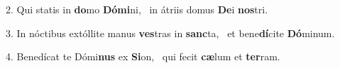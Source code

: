 2. Qui statis in \textbf{do}mo \textbf{Dó}\textbf{mi}ni, \ast\  in átriis domus \textbf{De}i \textbf{nos}tri.\

3. In nóctibus extóllite manus \textbf{ves}tras in \textbf{sanc}ta, \ast\  et bene\textbf{dí}cite \textbf{Dó}minum.\

4. Benedícat te Dómi\textbf{nus} ex \textbf{Si}on, \ast\  qui fecit \textbf{cæ}lum et \textbf{ter}ram.\

